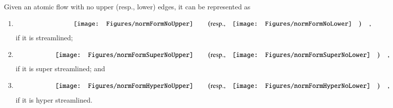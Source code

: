 \begin{proposition}\label{proposition:FlowNormalFormsNoUpper}
Given an atomic flow with no upper (resp., lower) edges, it can be represented as
\begin{enumerate}
\item\label{proposition:FlowNormalFormsNoUpper:item:Streamlined}
\[
\vcenter{\hbox{\texttt{[image: Figures/normFormNoUpper]}}}
\qquad
\left(\mbox{resp.,}\quad
\vcenter{\hbox{\texttt{[image: Figures/normFormNoLower]}}}
\quad\right)
\quad,
\]
if it is streamlined;
\item\label{proposition:FlowNormalFormsNoUpper:item:SuperStreamlined}
\[
\vcenter{\hbox{\texttt{[image: Figures/normFormSuperNoUpper]}}}
\qquad
\left(\mbox{resp.,}\quad
\vcenter{\hbox{\texttt{[image: Figures/normFormSuperNoLower]}}}
\quad\right)
\quad,
\]
if it is super streamlined; and
\item\label{proposition:FlowNormalFormsNoUpper:item:HyperStreamlined}
\[
\vcenter{\hbox{\texttt{[image: Figures/normFormHyperNoUpper]}}}
\qquad
\left(\mbox{resp.,}\quad
\vcenter{\hbox{\texttt{[image: Figures/normFormHyperNoLower]}}}
\quad\right)
\quad,
\]
if it is hyper streamlined.
\end{enumerate}
\end{proposition}